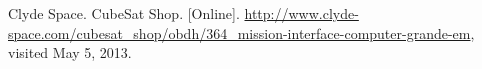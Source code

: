 \documentclass[12pt]{article}
\begin{document}
\begin{thebibliography}{9}

Clyde Space. CubeSat Shop. [Online]. \url{http://www.clyde-space.com/cubesat_shop/obdh/364_mission-interface-computer-grande-em}, visited May 5, 2013. 






\end{thebibliography}
\end{document}
